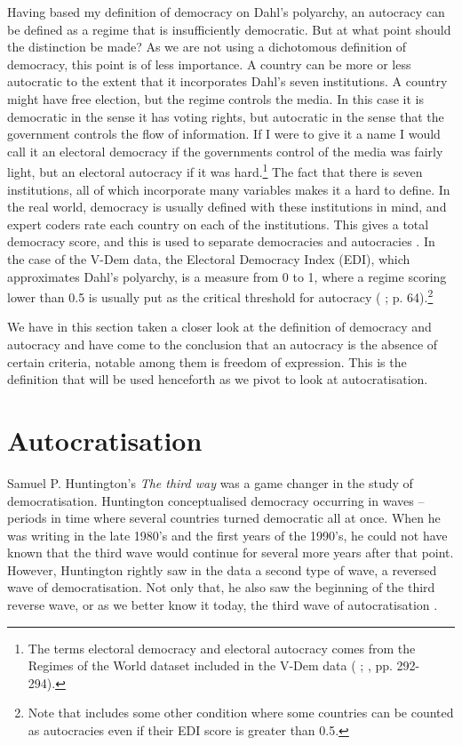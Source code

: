 Having based my definition of democracy on Dahl's polyarchy, an autocracy can be defined as a regime that is insufficiently democratic. But at what point should the distinction be made? As we are not using a dichotomous definition of democracy, this point is of less importance. A country can be more or less autocratic to the extent that it incorporates Dahl's seven institutions. A country might have free election, but the regime controls the media. In this case it is democratic in the sense it has voting rights, but autocratic in the sense that the government controls the flow of information. If I were to give it a name I would call it an electoral democracy if the governments control of the media was fairly light, but an electoral autocracy if it was hard.\footnote{The terms electoral democracy and electoral autocracy comes from the Regimes of the World dataset included in the V-Dem data (\citeauthor{coppedge_v-dem_2025} \citeyear{coppedge_v-dem_2025}; \citeauthor{coppedge_v-dem_2024-1} \citeyear{coppedge_v-dem_2024-1}, pp. 292-294).} The fact that there is seven institutions, all of which incorporate many variables makes it a hard to define. In the real world, democracy is usually defined with these institutions in mind, and expert coders rate each country on each of the institutions. This gives a total democracy score, and this is used to separate democracies and autocracies \citep{economist_intelligence_unit_democracy_2024, marshall_polity5_2020, coppedge_v-dem_2024-1}. In the case of the V-Dem data, the Electoral Democracy Index (EDI), which approximates Dahl's polyarchy, is a measure from 0 to 1, where a regime scoring lower than 0.5 is usually put as the critical threshold for autocracy (\citeauthor{lindberg_ordinal_2016} \citeyear{lindberg_ordinal_2016}; \citeauthor{luhrmann_regimes_2018} \citeyear{luhrmann_regimes_2018} p. 64).\footnote{Note that \citet{luhrmann_regimes_2018} includes some other condition where some countries can be counted as autocracies even if their EDI score is greater than 0.5.}

We have in this section taken a closer look at the definition of democracy and autocracy and have come to the conclusion that an autocracy is the absence of certain criteria, notable among them is freedom of expression. This is the definition that will be used henceforth as we pivot to look at autocratisation. 

\section{Autocratisation}
Samuel P. Huntington's \textit{The third way} \citeyearpar{huntington_third_1991} was a game changer in the study of democratisation. Huntington conceptualised democracy occurring in waves -- periods in time where several countries turned democratic all at once. When he was writing in the late 1980's and the first years of the 1990's, he could not have known that the third wave would continue for several more years after that point. However, Huntington rightly saw in the data a second type of wave, a reversed wave of democratisation. Not only that, he also saw the beginning of the third reverse wave, or as we better know it today, the third wave of autocratisation \citep{huntington_third_1991}. 

